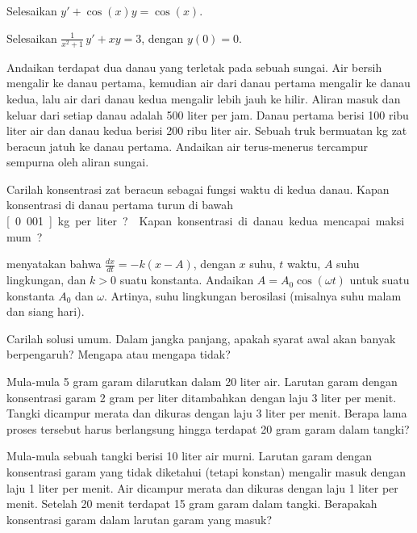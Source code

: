 \begin{exercise}
Selesaikan $y' + \cos (x) y = \cos(x)$.
\end{exercise}

\begin{exercise}
Selesaikan $\frac{1}{x^2+1} \, y' + x y = 3$, dengan $y(0) = 0$.
\end{exercise}

\begin{exercise}
Andaikan terdapat dua danau yang terletak pada sebuah sungai. Air bersih
mengalir ke danau pertama,
kemudian air dari danau pertama mengalir ke danau kedua, lalu
air dari danau kedua mengalir lebih jauh ke hilir.
Aliran masuk dan keluar dari setiap danau adalah 500 liter per jam.
Danau pertama berisi 100 ribu liter air dan
danau kedua berisi 200 ribu liter air.
Sebuah truk bermuatan \unit[500]{kg} zat beracun
jatuh ke danau pertama. Andaikan air terus-menerus
tercampur sempurna oleh aliran sungai.
\begin{tasks}
\task Carilah konsentrasi zat beracun
sebagai fungsi waktu di kedua danau.
\task Kapan
konsentrasi di danau pertama turun di bawah \unit[0.001]{kg} per liter?
\task Kapan
konsentrasi di danau kedua mencapai maksimum?
\end{tasks}
\end{exercise}

\begin{exercise}
 menyatakan bahwa $\frac{dx}{dt} = -k(x-A)$, dengan
$x$ suhu, $t$ waktu, $A$ suhu lingkungan,
dan $k > 0$ suatu konstanta.
Andaikan $A = A_0 \cos (\omega t)$ untuk suatu konstanta $A_0$ dan $\omega$.
Artinya, suhu lingkungan berosilasi (misalnya suhu malam dan
siang hari).
\begin{tasks}
\task Carilah solusi umum.
\task Dalam jangka panjang, apakah
syarat awal akan banyak berpengaruh? Mengapa atau mengapa tidak?
\end{tasks}
\end{exercise}

\begin{exercise}
Mula-mula 5 gram garam dilarutkan dalam 20 liter air. Larutan garam
dengan konsentrasi garam 2 gram per liter ditambahkan dengan laju
3 liter per menit. Tangki dicampur merata dan dikuras dengan laju 3 liter
per menit. Berapa lama proses tersebut harus berlangsung hingga terdapat 20 gram
garam dalam tangki?
\end{exercise}

\begin{exercise}
Mula-mula sebuah tangki berisi 10 liter air murni.
Larutan garam dengan konsentrasi garam yang tidak diketahui (tetapi konstan)
mengalir masuk dengan laju 1 liter per menit.
Air dicampur merata dan dikuras dengan laju 1 liter per menit.
Setelah 20 menit terdapat 15 gram garam dalam tangki. Berapakah
konsentrasi garam dalam larutan garam yang masuk?
\end{exercise}

